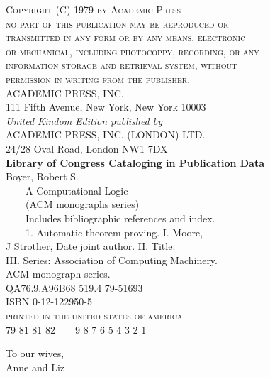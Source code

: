 \documentclass[10pt]{book}
\begin{document}
\begin{flushleft}\textsc{Copyright (C) 1979 by Academic Press\\
no part of this publication may be reproduced or\\
transmitted in any form or by any means, electronic\\
or mechanical, including photocoppy, recording, or any\\
information storage and retrieval system, without\\
permission in writing from the publisher.}\\
\vspace{3\baselineskip} ACADEMIC PRESS, INC.\\
\small 111 Fifth Avenue, New York, New York 10003\normalsize\\
\vspace{3\baselineskip} \emph{United Kindom Edition published by}\\
ACADEMIC PRESS, INC. (LONDON) LTD.\\
\small 24/28 Oval Road, London NW1  7DX\normalsize\\
\vspace{3\baselineskip}\small\textbf{Library of Congress Cataloging in Publication Data}\\
\vspace{\baselineskip}
Boyer, Robert S.\\
\ \ \ \ A Computational Logic\\
\vspace{\baselineskip}
\ \ \ \ (ACM monographs series)\\
\ \ \ \ Includes bibliographic references and index.\\
\ \ \ \ 1.  Automatic theorem proving.   I.  Moore,\\
J Strother, Date       joint author. II. Title.\\
III. Series:   Association of Computing Machinery.\\
ACM monograph series.\\
QA76.9.A96B68    519.4   79-51693\\
ISBN 0-12-122950-5\\
\vspace{2\baselineskip}\textsc{printed in the united states of america}\\
\vspace{\baselineskip}\footnotesize 79 81 81 82\ \ \ \ 9 8 7 6 5 4 3 2 1\normalsize\end{flushleft}
\newpage \thispagestyle{empty} \vspace*{1.2in} \Large \begin{flushleft}To our wives,\\
\vspace{.5\baselineskip}Anne and Liz\end{flushleft}
\newpage \thispagestyle{empty} \newpage\thispagestyle{empty}
\tableofcontents
\mainmatter
\end{document}

